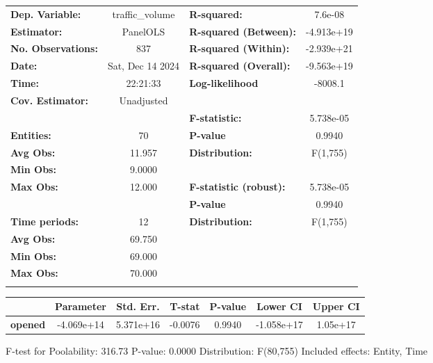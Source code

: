 \begin{center}
\begin{tabular}{lclc}
\toprule
\textbf{Dep. Variable:}    &  traffic\_volume   & \textbf{  R-squared:         }   &      7.6e-08     \\
\textbf{Estimator:}        &      PanelOLS      & \textbf{  R-squared (Between):}  &    -4.913e+19    \\
\textbf{No. Observations:} &        837         & \textbf{  R-squared (Within):}   &    -2.939e+21    \\
\textbf{Date:}             &  Sat, Dec 14 2024  & \textbf{  R-squared (Overall):}  &    -9.563e+19    \\
\textbf{Time:}             &      22:21:33      & \textbf{  Log-likelihood     }   &     -8008.1      \\
\textbf{Cov. Estimator:}   &     Unadjusted     & \textbf{                     }   &                  \\
\textbf{}                  &                    & \textbf{  F-statistic:       }   &    5.738e-05     \\
\textbf{Entities:}         &         70         & \textbf{  P-value            }   &      0.9940      \\
\textbf{Avg Obs:}          &       11.957       & \textbf{  Distribution:      }   &     F(1,755)     \\
\textbf{Min Obs:}          &       9.0000       & \textbf{                     }   &                  \\
\textbf{Max Obs:}          &       12.000       & \textbf{  F-statistic (robust):} &    5.738e-05     \\
\textbf{}                  &                    & \textbf{  P-value            }   &      0.9940      \\
\textbf{Time periods:}     &         12         & \textbf{  Distribution:      }   &     F(1,755)     \\
\textbf{Avg Obs:}          &       69.750       & \textbf{                     }   &                  \\
\textbf{Min Obs:}          &       69.000       & \textbf{                     }   &                  \\
\textbf{Max Obs:}          &       70.000       & \textbf{                     }   &                  \\
\textbf{}                  &                    & \textbf{                     }   &                  \\
\bottomrule
\end{tabular}
\begin{tabular}{lcccccc}
                & \textbf{Parameter} & \textbf{Std. Err.} & \textbf{T-stat} & \textbf{P-value} & \textbf{Lower CI} & \textbf{Upper CI}  \\
\midrule
\textbf{opened} &     -4.069e+14     &     5.371e+16      &     -0.0076     &      0.9940      &     -1.058e+17    &      1.05e+17      \\
\bottomrule
\end{tabular}
\end{center}

F-test for Poolability: 316.73 \newline
 P-value: 0.0000 \newline
 Distribution: F(80,755) \newline
  \newline
 Included effects: Entity, Time